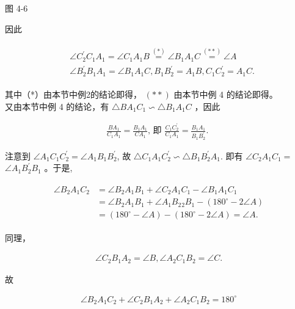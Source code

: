 \documentclass[10pt]{article}
\begin{document}
图 4-6

因此

\begin{align*}
\begin{aligned}
& \angle C_{2}^{\prime} C_{1} A_{1}=\angle C_{1} A_{1} B \stackrel{(*)}{=} \angle B_{1} A_{1} C \stackrel{(* *)}{=} \angle A \\
& \angle B_{2}^{\prime} B_{1} A_{1}=\angle B_{1} A_{1} C, B_{1} B_{2}^{\prime}=A_{1} B, C_{1} C_{2}^{\prime}=A_{1} C .
\end{aligned}
\end{align*}

其中（*）由本节中例2的结论即得， $(* *)$ 由本节中例 4 的结论即得。\\
又由本节中例 4 的结论，有 $\triangle B A_{1} C_{1} \backsim \triangle B_{1} A_{1} C$ ，因此

\begin{align*}
\frac{B A_{1}}{C_{1} A_{1}}=\frac{B_{1} A_{1}}{C A_{1}} \text {, 即 } \frac{C_{1} C_{2}^{\prime}}{C_{1} A_{1}}=\frac{B_{1} A_{1}}{B_{1} B_{2}^{\prime}} \text {. }
\end{align*}

注意到 $\angle A_{1} C_{1} C_{2}^{\prime}=\angle A_{1} B_{1} B_{2}^{\prime}$, 故 $\triangle C_{1} A_{1} C_{2}^{\prime} \backsim \triangle B_{1} B_{2}^{\prime} A_{1}$. 即有 $\angle C_{2} A_{1} C_{1}=$ $\angle A_{1} B_{2}^{\prime} B_{1}$ 。于是,

\begin{align*}
\begin{aligned}
\angle B_{2} A_{1} C_{2} & =\angle B_{2} A_{1} B_{1}+\angle C_{2} A_{1} C_{1}-\angle B_{1} A_{1} C_{1} \\
& =\angle B_{2} A_{1} B_{1}+\angle A_{1} B_{2}{ }_{2} B_{1}-\left(180^{\circ}-2 \angle A\right) \\
& =\left(180^{\circ}-\angle A\right)-\left(180^{\circ}-2 \angle A\right)=\angle A .
\end{aligned}
\end{align*}

同理，

\begin{align*}
\angle C_{2} B_{1} A_{2}=\angle B, \angle A_{2} C_{1} B_{2}=\angle C .
\end{align*}

故

\begin{align*}
\angle B_{2} A_{1} C_{2}+\angle C_{2} B_{1} A_{2}+\angle A_{2} C_{1} B_{2}=180^{\circ}
\end{align*}
\end{document}
